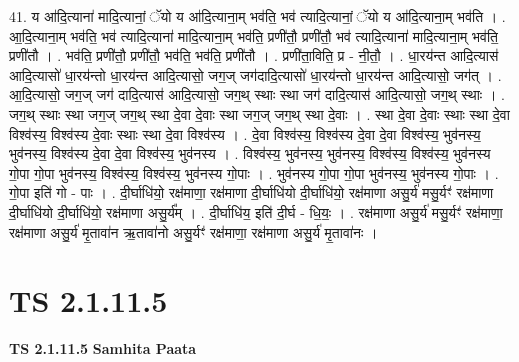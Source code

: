 \documentclass[17pt]{extarticle}
\begin{document}
41. य आ॑दि॒त्याना॑ मादि॒त्यानां॒ ॅयो य आ॑दि॒त्याना॒म् भव॑ति॒ भव॑ त्यादि॒त्यानां॒ ॅयो य आ॑दि॒त्याना॒म् भव॑ति । . आ॒दि॒त्याना॒म् भव॑ति॒ भव॑ त्यादि॒त्याना॑ मादि॒त्याना॒म् भव॑ति॒ प्रणी॑तौ॒ प्रणी॑तौ॒ भव॑ त्यादि॒त्याना॑ मादि॒त्याना॒म् भव॑ति॒ प्रणी॑तौ । . भव॑ति॒ प्रणी॑तौ॒ प्रणी॑तौ॒ भव॑ति॒ भव॑ति॒ प्रणी॑तौ । . प्रणी॑ता॒विति॒ प्र - नी॒तौ॒ । . धा॒रय॑न्त आदि॒त्यास॑ आदि॒त्यासो॑ धा॒रय॑न्तो धा॒रय॑न्त आदि॒त्यासो॒ जग॒ज् जग॑दादि॒त्यासो॑ धा॒रय॑न्तो धा॒रय॑न्त आदि॒त्यासो॒ जग॑त् । . आ॒दि॒त्यासो॒ जग॒ज् जग॑ दादि॒त्यास॑ आदि॒त्यासो॒ जग॒थ् स्थाः स्था जग॑ दादि॒त्यास॑ आदि॒त्यासो॒ जग॒थ् स्थाः । . जग॒थ् स्थाः स्था जग॒ज् जग॒थ् स्था दे॒वा दे॒वाः स्था जग॒ज् जग॒थ् स्था दे॒वाः । . स्था दे॒वा दे॒वाः स्थाः स्था दे॒वा विश्व॑स्य॒ विश्व॑स्य दे॒वाः स्थाः स्था दे॒वा विश्व॑स्य । . दे॒वा विश्व॑स्य॒ विश्व॑स्य दे॒वा दे॒वा विश्व॑स्य॒ भुव॑नस्य॒ भुव॑नस्य॒ विश्व॑स्य दे॒वा दे॒वा विश्व॑स्य॒ भुव॑नस्य । . विश्व॑स्य॒ भुव॑नस्य॒ भुव॑नस्य॒ विश्व॑स्य॒ विश्व॑स्य॒ भुव॑नस्य गो॒पा गो॒पा भुव॑नस्य॒ विश्व॑स्य॒ विश्व॑स्य॒ भुव॑नस्य गो॒पाः । . भुव॑नस्य गो॒पा गो॒पा भुव॑नस्य॒ भुव॑नस्य गो॒पाः । . गो॒पा इति॑ गो - पाः । . दी॒र्घाधि॑यो॒ रक्ष॑माणा॒ रक्ष॑माणा दी॒र्घाधि॑यो दी॒र्घाधि॑यो॒ रक्ष॑माणा असु॒र्य॑ मसु॒र्यꣳ॑ रक्ष॑माणा दी॒र्घाधि॑यो दी॒र्घाधि॑यो॒ रक्ष॑माणा असु॒र्य᳚म् । . दी॒र्घाधि॑य॒ इति॑ दी॒र्घ - धि॒यः॒ । . रक्ष॑माणा असु॒र्य॑ मसु॒र्यꣳ॑ रक्ष॑माणा॒ रक्ष॑माणा असु॒र्य॑ मृ॒तावा॑न ऋ॒तावा॑नो असु॒र्यꣳ॑ रक्ष॑माणा॒ रक्ष॑माणा असु॒र्य॑ मृ॒तावा॑नः । \newline
\pagebreak
{}
\section*{ TS 2.1.11.5 }

\textbf{TS 2.1.11.5 } \newline
\textbf{Samhita Paata} \newline
\end{document}
